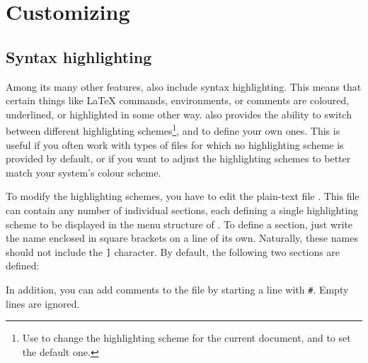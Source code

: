 
\chapter{Customizing \Tw}

\section{Syntax highlighting}

Among its many other features, {\Tw} also include syntax highlighting. This means that certain things like {\LaTeX} commands, environments, or comments are coloured, underlined, or highlighted in some other way. {\Tw} also provides the ability to switch between different highlighting schemes\footnote{Use \submenu{} to change the highlighting scheme for the current document, and \submenu{}\submenu{} to set the default one.}, and to define your own ones. This is useful if you often work with types of files for which no highlighting scheme is provided by default, or if you want to adjust the highlighting schemes to better match your system's colour scheme.

To modify the highlighting schemes, you have to edit the plain-text file . This file can contain any number of individual sections, each defining a single highlighting scheme to be displayed in the menu structure of {\Tw}. To define a section, just write the name enclosed in square brackets on a line of its own. Naturally, these names should not include the \verb|]| character. By default, the following two sections are defined:
\begin{verbExample}
[LaTeX]
[ConTeXt]
\end{verbExample}
In addition, you can add comments to the file by starting a line with \verb|#|. Empty lines are ignored.

